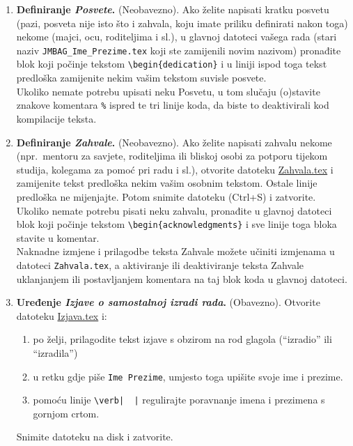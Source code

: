 \begin{enumerate}
	\item {\color{red} \textbf{Definiranje \emph{Posvete}.}} (Neobavezno). Ako želite napisati kratku posvetu (pazi, posveta nije isto što i zahvala, koju imate priliku definirati nakon toga) nekome (majci, ocu, roditeljima i sl.), u glavnoj datoteci vašega rada (stari naziv \verb|JMBAG_Ime_Prezime.tex| koji ste zamijenili novim nazivom) pronađite blok koji počinje tekstom \verb|\begin{dedication}| i u liniji ispod toga tekst predloška zamijenite nekim vašim tekstom suvisle posvete. \\
	Ukoliko nemate potrebu upisati neku Posvetu, u tom slučaju (o)stavite znakove komentara \verb|%| ispred te tri linije koda, da biste to deaktivirali kod kompilacije teksta.
	\item {\color{red} \textbf{Definiranje \emph{Zahvale}.}} (Neobavezno). Ako želite napisati zahvalu nekome (npr.\ mentoru za savjete, roditeljima ili bliskoj osobi za potporu tijekom studija, kolegama za pomoć pri radu i sl.), otvorite datoteku \href{run:Zahvala.tex}{{\color{blue}Zahvala.tex}} i zamijenite tekst predloška nekim vašim osobnim tekstom. Ostale linije predloška ne mijenjajte. Potom snimite datoteku (Ctrl+S) i zatvorite.\\ 
	Ukoliko nemate potrebu pisati neku zahvalu, pronađite u glavnoj datoteci blok koji počinje tekstom \verb|\begin{acknowledgments}| i sve linije toga bloka stavite u komentar. \\
	Naknadne izmjene i prilagodbe teksta Zahvale možete učiniti izmjenama u datoteci \verb|Zahvala.tex|, a aktiviranje ili deaktiviranje teksta Zahvale uklanjanjem ili postavljanjem komentara na taj blok koda u glavnoj datoteci.
	\item {\color{red} \textbf{Uređenje \emph{Izjave o samostalnoj izradi rada}.}} (Obavezno). Otvorite datoteku \href{run:Izjava.tex}{{\color{blue}Izjava.tex}} i:
	\begin{enumerate}
		\item po želji, prilagodite tekst izjave s obzirom na rod glagola (``izradio'' ili ``izradila'')
		\item  u retku gdje piše \verb|Ime Prezime|, umjesto toga upišite svoje ime i prezime.
		\item pomoću linije \verb+\verb|  |+ regulirajte poravnanje imena i prezimena s gornjom crtom.
	\end{enumerate}
	Snimite datoteku na disk i zatvorite.
\end{enumerate}

